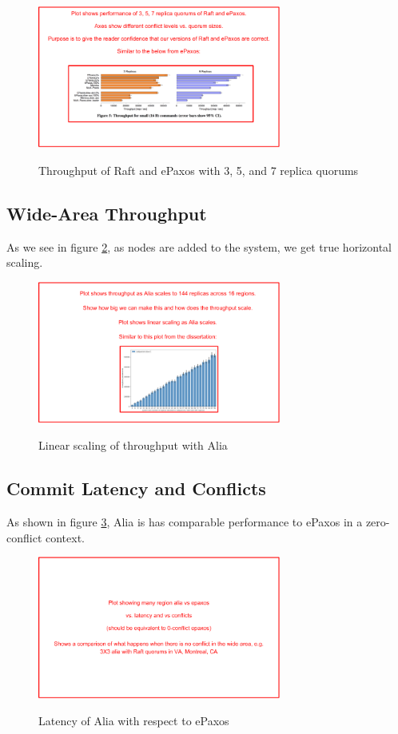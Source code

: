 \documentclass[sigplan,screen,review,anonymous,nonacm]{acmart}
\begin{document}
\begin{figure}
\caption{Throughput of Raft and ePaxos with 3, 5, and 7 replica quorums}
\centering
\includegraphics[width=8cm]{raft-epaxos-baseline-2-placeholder.png}
\label{fig:raft-epaxos-baseline-2}
\end{figure}


\subsection{Wide-Area Throughput}

As we see in figure \ref{fig:alia-linear-scaling}, as nodes are added to the system, we get true horizontal scaling. 

\begin{figure}
\caption{Linear scaling of throughput with Alia}
\centering
\includegraphics[width=8cm]{16-region-alia-placeholder.png}
\label{fig:alia-linear-scaling}
\end{figure}

\subsection{Commit Latency and Conflicts}

As shown in figure \ref{fig:alia-vs-epaxos}, Alia is has comparable performance
to ePaxos in a zero-conflict context.

\begin{figure}
\caption{Latency of Alia with respect to ePaxos}
\centering
\includegraphics[width=8cm]{alia-vs-epaxos-placeholder.png}
\label{fig:alia-vs-epaxos}
\end{figure}
\end{document}
